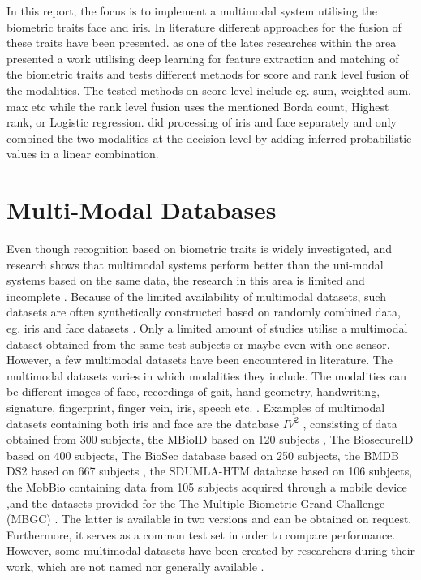 In this report, the focus is to implement a multimodal system utilising the biometric traits face and iris. In literature different approaches for the fusion of these traits have been presented. \cite{Al-Waisy2017a} as one of the lates researches within the area presented a work utilising deep learning for feature extraction and matching of the biometric traits and tests different methods for score and rank level fusion of the modalities. The tested methods on score level include eg.  sum, weighted sum, max etc while the rank level fusion uses the mentioned Borda count, Highest rank, or Logistic regression. \cite{Chen2005a} did processing of iris and face separately and only combined the two modalities at the decision-level by adding inferred probabilistic values in a linear combination.   

\section{Multi-Modal Databases}
Even though recognition based on biometric traits is widely investigated, and research shows that multimodal systems perform better than the uni-modal systems based on the same data, the research in this area is limited and incomplete \citep{Chen2005a,Bowyer2016b}. Because of the limited availability of multimodal datasets, such datasets are often synthetically constructed based on randomly combined data, eg. iris and face datasets \citep{Chen2005a}. Only a limited amount of studies  utilise a multimodal dataset obtained from the same test subjects or maybe even with one sensor. However, a few multimodal datasets have been encountered in literature. The multimodal datasets varies in which modalities they include. The modalities can be different images of face, recordings of gait, hand geometry, handwriting, signature, fingerprint, finger vein, iris, speech etc. \citep{Yin2011, Dessimoz2007, Ross2003, Ortega-Garcia2010}. Examples of multimodal datasets containing both iris and face are the database $IV^2$ \citep{Petrovska-Delacretaz2008a}, consisting of data obtained from 300 subjects, the MBioID based on 120 subjects \citep{Dessimoz2007}, The BiosecureID based on 400 subjects, The BioSec database based on 250 subjects, the BMDB DS2 based on 667 subjects \citep{Ortega-Garcia2010}, the SDUMLA-HTM database based on 106 subjects, the MobBio containing data from 105 subjects acquired through a mobile device \citep{Sequeira2014},and the datasets provided for the The Multiple Biometric Grand Challenge (MBGC) \citep{Bowyer2016b}. The latter is available in two versions and can be obtained on request. Furthermore, it serves as a common test set in order to compare performance. However, some multimodal datasets have been created by researchers during their work, which are not named nor generally available \citep{Bowyer2016b}. 

